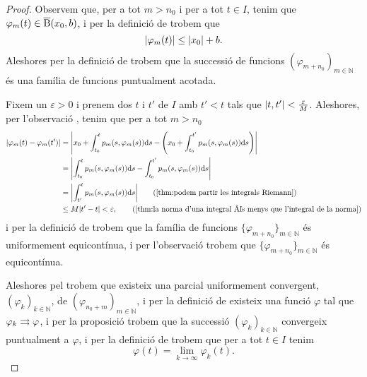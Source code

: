 \documentclass[../Apunts.tex]{subfiles}
\begin{document}
\begin{theorem}
\begin{proof}
			Observem que, per a tot \(m>n_{0}\) i per a tot \(t\in I\), tenim que \(\varphi_{m}(t)\in\overline{\operatorname{B}}(x_{0},b)\), i per la definició de  trobem que
			\[\norm{\varphi_{m}(t)}\leq\norm{x_{0}}+b.\]
			Aleshores per la definició de  trobem que la successió de funcions \((\varphi_{m+n_{0}})_{m\in\mathbb{N}}\) és una família de funcions puntualment acotada.
			
			Fixem un \(\varepsilon>0\) i prenem dos \(t\) i \(t'\) de \(I\) amb \(t'<t\) tals que \(\abs{t,t'}<\frac{\varepsilon}{M}\). Aleshores, per l'observació , tenim que per a tot \(m>n_{0}\)
			\begin{align*}
				\norm{\varphi_{m}(t)-\varphi_{m}(t')}&=\norm{x_{0}+\int_{t_{0}}^{t}p_{m}(s,\varphi_{m}(s))\diff s-\Bigg(x_{0}+\int_{t_{0}}^{t'}p_{m}(s,\varphi_{m}(s))\diff s\Bigg)} \\
				&=\norm{\int_{t_{0}}^{t}p_{m}(s,\varphi_{m}(s))\diff s-\int_{t_{0}}^{t'}p_{m}(s,\varphi_{m}(s))\diff s} \\
				&=\norm{\int_{t'}^{t}p_{m}(s,\varphi_{m}(s))\diff s} \tag{\ref{thm:podem partir les integrals Riemann}} \\
				&\leq M\abs{t'-t}<\varepsilon, \tag{\ref{thm:la norma d'una integral és menys que l'integral de la norma}}
			\end{align*}
			i per la definició de  trobem que la família de funcions \(\{\varphi_{m+n_{0}}\}_{m\in\mathbb{N}}\) és uniformement equicontínua, i per l'observació  trobem que \(\{\varphi_{m+n_{0}}\}_{m\in\mathbb{N}}\) és equicontínua.
			
			Aleshores pel  trobem que existeix una parcial uniformement convergent, \((\varphi_{k})_{k\in\mathbb{N}}\), de \((\varphi_{n_{0}+m})_{m\in\mathbb{N}}\), i per la definició de  existeix una funció \(\varphi\) tal que \(\varphi_{k}\rightrightarrows\varphi\), i per la proposició  trobem que la successió \((\varphi_{k})_{k\in\mathbb{N}}\) convergeix puntualment a \(\varphi\), i per la definició de  trobem que per a tot \(t\in I\) tenim
			\begin{equation}
				\label{thm:Teorema de Peano:eq1}
				\varphi(t)=\lim_{k\to\infty}\varphi_{k}(t).
			\end{equation}
			

\end{proof}
\end{theorem}
\end{document}

